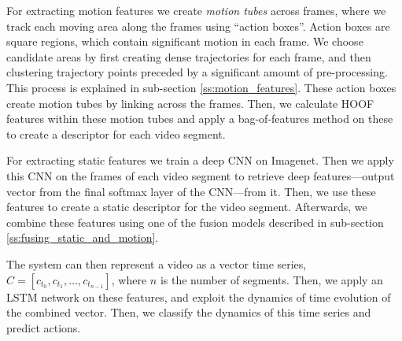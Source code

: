 For extracting motion features we create \textit{motion tubes} across frames, where we track each moving area along the frames using ``action boxes''.
Action boxes are square regions, which contain significant motion in each frame. We choose candidate areas by first creating dense trajectories for each frame,
and then clustering trajectory points preceded by a significant amount of pre-processing. This process is explained in sub-section \ref{ss:motion_features}.
These action boxes create motion tubes by linking across the frames. Then, we calculate HOOF~\cite{chaudhry2009histograms} features within these motion tubes and apply a
bag-of-features method on these to create a descriptor for each video segment.

For extracting static features we train a deep CNN on Imagenet. Then we apply this CNN
on the frames of each video segment to retrieve deep features---output vector from the final softmax layer of the CNN---from it. Then, we use these features
to create a static descriptor for the video segment. Afterwards, we combine these features using one of the fusion models described in sub-section \ref{ss:fusing_static_and_motion}.

The system can then represent a video as a vector time series, $C = [c_{t_0}, c_{t_1}, \dots, c_{t_{n-1}}]$,
where $n$ is the number of segments. Then, we apply an LSTM network on these features, and exploit the dynamics of time evolution of the combined vector.
Then, we classify the dynamics of this time series and predict actions.



